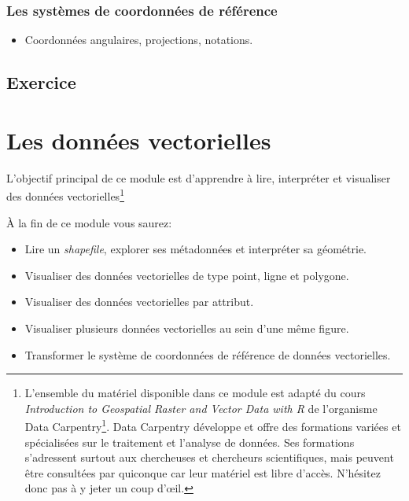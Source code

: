 \documentclass[
  12pt,
]{krantz}
\providecommand{\tightlist}{%
  \setlength{\itemsep}{0pt}\setlength{\parskip}{0pt}}
\renewcommand{\href}[2]{#2\footnote{\url{#1}}}
\begin{document}
\hypertarget{les-systuxe8mes-de-coordonnuxe9es-de-ruxe9fuxe9rence}{%
\subsection{Les systèmes de coordonnées de référence}\label{les-systuxe8mes-de-coordonnuxe9es-de-ruxe9fuxe9rence}}

\begin{itemize}
\tightlist
\item
  Coordonnées angulaires, projections, notations.
\end{itemize}

\hypertarget{exercice-1}{%
\section{Exercice}\label{exercice-1}}

\hypertarget{vec}{%
\chapter{Les données vectorielles}\label{vec}}

L'objectif principal de ce module est d'apprendre à lire, interpréter et visualiser des données vectorielles\footnote{L'ensemble du matériel disponible dans ce module est adapté du cours \emph{Introduction to Geospatial Raster and Vector Data with R} \citep{Data_Carpentry_IntroGeospatial} de l'organisme \href{https://datacarpentry.org/}{Data Carpentry}. Data Carpentry développe et offre des formations variées et spécialisées sur le traitement et l'analyse de données. Ses formations s'adressent surtout aux chercheuses et chercheurs scientifiques, mais peuvent être consultées par quiconque car leur matériel est libre d'accès. N'hésitez donc pas à y jeter un coup d'œil.}

À la fin de ce module vous saurez:

\begin{itemize}
\tightlist
\item
  Lire un \emph{shapefile}, explorer ses métadonnées et interpréter sa géométrie.
\item
  Visualiser des données vectorielles de type point, ligne et polygone.
\item
  Visualiser des données vectorielles par attribut.
\item
  Visualiser plusieurs données vectorielles au sein d'une même figure.
\item
  Transformer le système de coordonnées de référence de données vectorielles.
\end{itemize}
\end{document}
